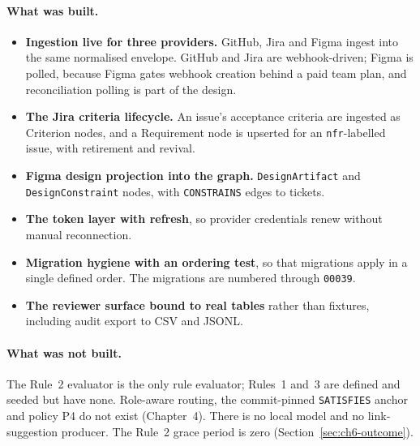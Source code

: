 \paragraph{What was built.}
\begin{itemize}
  \item \textbf{Ingestion live for three providers.} GitHub, Jira and Figma
    ingest into the same normalised envelope. GitHub and Jira are
    webhook-driven; Figma is polled, because Figma gates webhook creation behind
    a paid team plan, and reconciliation polling is part of the design.
  \item \textbf{The Jira criteria lifecycle.} An issue's acceptance criteria are
    ingested as Criterion nodes, and a Requirement node is upserted for an
    \texttt{nfr}-labelled issue, with retirement and revival.
  \item \textbf{Figma design projection into the graph.} \texttt{DesignArtifact}
    and \texttt{DesignConstraint} nodes, with \texttt{CONSTRAINS} edges to
    tickets.
  \item \textbf{The token layer with refresh}, so provider credentials renew
    without manual reconnection.
  \item \textbf{Migration hygiene with an ordering test}, so that migrations
    apply in a single defined order. The migrations are numbered through
    \texttt{00039}.
  \item \textbf{The reviewer surface bound to real tables} rather than
    fixtures, including audit export to CSV and JSONL.
\end{itemize}

\paragraph{What was not built.} The Rule~2 evaluator is the only rule
evaluator; Rules~1 and~3 are defined and seeded but have none. Role-aware
routing, the commit-pinned \texttt{SATISFIES} anchor and policy P4 do not exist
(Chapter~4). There is no local model and no link-suggestion producer. The
Rule~2 grace period is zero (Section~\ref{sec:ch6-outcome}).
